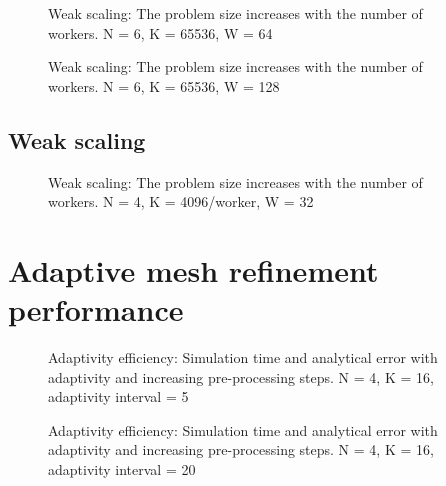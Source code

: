 \begin{figure}[H]
	\centering
	
	\caption{Weak scaling: The problem size increases with the number of workers. N = 6, K = 65536, W = 64}
	\label{fig:strong_scaling_N6_W64}
\end{figure}

\begin{figure}[H]
	\centering
	
	\caption{Weak scaling: The problem size increases with the number of workers. N = 6, K = 65536, W = 128}
	\label{fig:strong_scaling_N6_W128}
\end{figure}

\subsection{Weak scaling} \label{section:results:scaling_tests:weak}


\begin{figure}[H]
	\centering
	
	\caption{Weak scaling: The problem size increases with the number of workers. N = 4, K = 4096/worker, W = 32}
	\label{fig:weak_scaling}
\end{figure}

\section{Adaptive mesh refinement performance} \label{section:results:adaptivity_performance}

\begin{figure}[H]
	\centering
	
	\caption{Adaptivity efficiency: Simulation time and analytical error with adaptivity and increasing pre-processing steps. N = 4, K = 16, adaptivity interval = 5}
	\label{fig:adaptivity_efficiency_C5}
\end{figure}

\begin{figure}[H]
	\centering
	
	\caption{Adaptivity efficiency: Simulation time and analytical error with adaptivity and increasing pre-processing steps. N = 4, K = 16, adaptivity interval = 20}
	\label{fig:adaptivity_efficiency_C20}
\end{figure}

